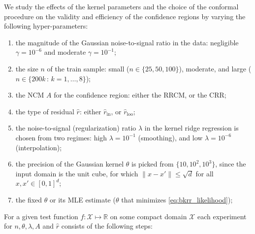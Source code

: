 \documentclass[a4paper,14pt]{extarticle}
\newcommand{\Xcal}{\mathcal{X}}
\newcommand{\Real}{\mathbb{R}}
\begin{document}
We study the effects of the kernel parameters and the choice of the conformal procedure
on the validity and efficiency of the confidence regions by varying the following
hyper-parameters: \begin{enumerate}
  \item the magnitude of the Gaussian noise-to-signal ratio in the data: negligible
  $\gamma = 10^{-6}$ and moderate $\gamma = 10^{-1}$;
  \item the size $n$ of the train sample: small ($n \in \{ 25, 50, 100\}$),
  moderate, and large ($n \in \{200 k\,:\, k=1, \ldots, 8 \}$);
  \item the NCM $A$ for the confidence region: either the RRCM, or the CRR;
  \item the type of residual $\hat{r}$: either $\hat{r}_{\text{in}}$, or $\hat{r}_{\text{loo}}$;
  \item the noise-to-signal (regularization) ratio $\lambda$ in the kernel ridge
  regression is chosen from two regimes: high $\lambda = 10^{-1}$ (smoothing), and
  low $\lambda=10^{-6}$ (interpolation);
  \item the precision of the Gaussian kernel $\theta$ is picked from
  $\{10, 10^2, 10^3\}$, since the input domain is the unit cube, for which
  $\|x-x'\| \leq \sqrt{d}$ for all $x,x'\in[0,1]^d$;
  \item the fixed $\theta$ or its MLE estimate ($\theta$ that minimizes \ref{eq:bkrr_likelihood});
\end{enumerate}
For a given test function $f:\Xcal \mapsto \Real$ on some compact domain $\Xcal$
each experiment for $n, \theta, \lambda, A$ and $\hat{r}$ consists of the following
steps:
\end{document}
